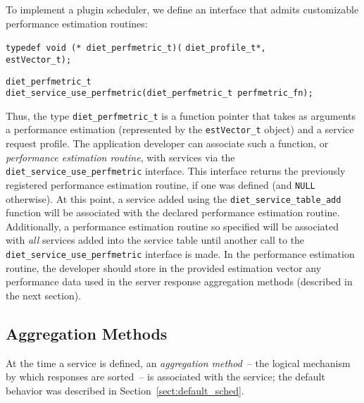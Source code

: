 To implement a plugin scheduler, we define an
interface that admits customizable performance estimation routines:
\begin{tabbing}
  \texttt{typedef void (* diet\_perfmetric\_t)(}
    \=\texttt{diet\_profile\_t*,} \\
    \>\texttt{estVector\_t);} \\
\end{tabbing}
\begin{tabbing}
  \texttt{diet\_perfmetric\_t} \\
  \texttt{diet\_service\_use\_perfmetric(diet\_perfmetric\_t perfmetric\_fn);}\\
\end{tabbing}
Thus, the type \texttt{diet\_perfmetric\_t} is a function pointer that
takes as arguments a performance estimation (represented by the
\texttt{estVector\_t} object) and a \diet service request
profile.  The application
developer can associate such a function, or
\emph{performance estimation routine}, with \diet services via the
\texttt{diet\_service\_use\_perfmetric} interface.  This interface
returns the previously registered performance estimation routine, if
one was defined (and
\texttt{NULL} otherwise).  At this point, a service added using the
\texttt{diet\_service\_table\_add} function will be associated with
the declared performance estimation routine.
Additionally, a performance estimation routine so specified will be
associated with \emph{all} services added into the service table until
another call to the
\texttt{diet\_service\_use\_perfmetric} interface is made.
In the performance estimation routine, the {\sed} developer should store
in the provided estimation vector
any performance data used in the server response aggregation
methods (described in the next section).

\subsection{Aggregation Methods}\label{sect:agg_methods}

At the time a \diet service is defined, an \emph{aggregation method}~--
the logical mechanism by which {\sed} responses are sorted~-- is
associated with the service; the default behavior was described in
Section~\ref{sect:default_sched}.

